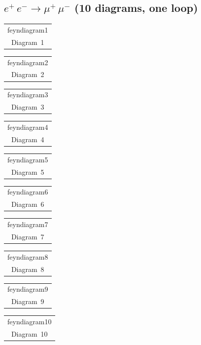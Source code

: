 \documentclass[a4paper,11pt]{article}
\makeatletter
\newcommand{\FeynDiagram}[1]{\csname feyndiagram#1\endcsname}
\newcommand{\FeynCell}[1]{\begin{tabular}[t]{@{}c@{}}\FeynDiagram{#1}\\[1ex]\small Diagram~#1\end{tabular}}
\makeatother
\begin{document}
\setlength{\parindent}{0pt}
\subsection*{$e^{+}\,e^{-} \to \mu^{+}\,\mu^{-}$ \normalfont(10 diagrams, one loop)}
\noindent \FeynCell{1}\par\bigskip
\noindent \FeynCell{2}\par\bigskip
\noindent \FeynCell{3}\par\bigskip
\noindent \FeynCell{4}\par\bigskip
\noindent \FeynCell{5}\par\bigskip
\noindent \FeynCell{6}\par\bigskip
\noindent \FeynCell{7}\par\bigskip
\noindent \FeynCell{8}\par\bigskip
\noindent \FeynCell{9}\par\bigskip
\noindent \FeynCell{10}\par\bigskip
\end{document}

